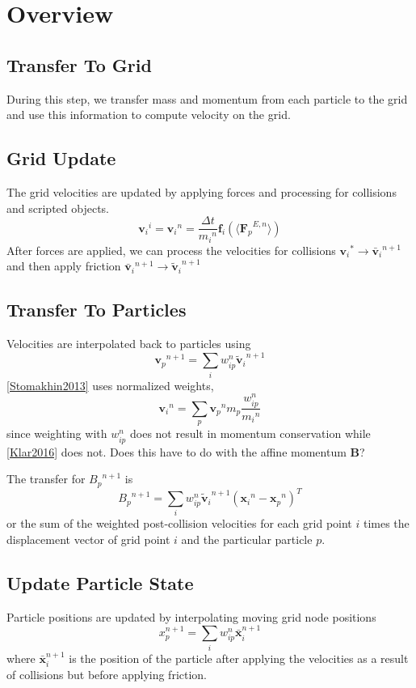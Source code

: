 \documentclass{article}
\theoremstyle{definition}
\newenvironment{redtext}{\color{red}}{\ignorespacesafterend}
\begin{document}
\section{Overview}
\subsection{Transfer To Grid}
During this step, we transfer mass and momentum from each particle to the grid and use this information to compute velocity on the grid.

\subsection{Grid Update}
The grid velocities are updated by applying forces and processing for collisions and scripted objects.
\begin{equation*}
{\textbf{v}_i}^i = {\textbf{v}_i}^n=\frac{\Delta t}{{m_i}^n}\textbf{f}_i(\langle {\textbf{F}_p}^{E,n}\rangle)
\end{equation*}
After forces are applied, we can process the velocities for collisions ${\textbf{v}_i}^*\rightarrow {\bar{\textbf{v}}_{i}}^{n+1}$ and then apply friction ${\bar{\textbf{v}}_{i}}^{n+1} \rightarrow {\tilde{\textbf{v}}_{i}}^{n+1}$

\subsection{Transfer To Particles}
Velocities are interpolated back to particles using
\begin{equation*}
{\textbf{v}_p}^{n+1} = \sum_i{{w_{ip}^n{\tilde{\textbf{v}}_{i}}^{n+1}}}
\end{equation*}
\begin{redtext}
	\ref{Stomakhin2013} uses normalized weights,
	\begin{equation*}
	{\textbf{v}_i}^n = \sum_p{{\textbf{v}_p}^nm_p\frac{{w_{ip}^n}}{{m_i}^n}}
	\end{equation*}
	since weighting with ${w_{ip}^n}$ does not result in momentum conservation while \ref{Klar2016} does not. Does this have to do with the affine momentum $\textbf{B}$?
\end{redtext}

The transfer for ${B_p}^{n+1}$ is
\begin{equation*}
{B_p}^{n+1}=\sum_i{w_{ip}^n{\tilde{\textbf{v}}_i}^{n+1}({\textbf{x}_i}^n-{\textbf{x}_p}^n)^T}
\end{equation*}
or the sum of the weighted post-collision velocities for each grid point $i$ times the displacement vector of grid point $i$ and the particular particle $p$.

\subsection{Update Particle State}
Particle positions are updated by interpolating moving grid node positions
\begin{equation*}
x_p^{n+1}=\sum_i{w_{ip}^n \bar{\textbf{x}}_i^{n+1}}
\end{equation*}
where $\bar{\textbf{x}}_i^{n+1}$ is the position of the particle after applying the velocities as a result of collisions but before applying friction.
\end{document}
